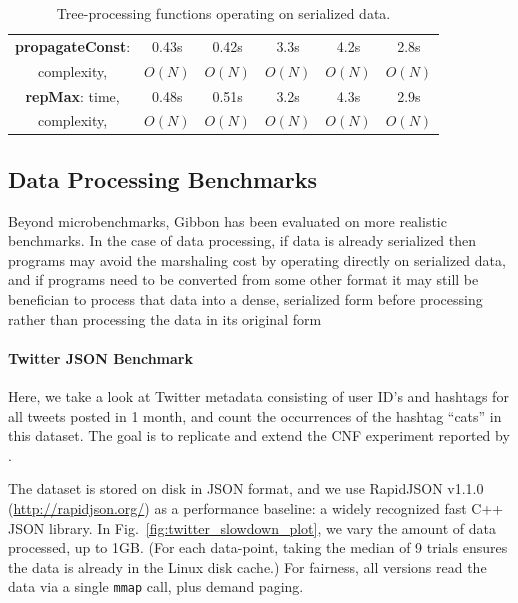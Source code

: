 \documentclass[showabstract,showacknowledgments,showpreface,showdedication,school]{iuphd}
\theoremstyle{nonumberplain}
\newcommand{\figref}[1]{Fig.~\ref{#1}}
\newcommand{\il}[1]{\lstinline[style=inline,mathescape=true];#1;}
\begin{document}
\begin{table}
\begin{center}
\begin{tabular}{ |c|c|c|c|c|c| }
                    {\bf propagateConst}:
                                         & 0.43s  &  0.42s  &  3.3s   & 4.2s   & 2.8s   \\
                    complexity,          & $O(N)$ &  $O(N)$ &  $O(N)$ & $O(N)$ & $O(N)$  \\
                    \hline

                    {\bf repMax}:
                    time,                & 0.48s  & 0.51s   & 3.2s    & 4.3s    & 2.9s   \\
                    complexity,          & $O(N)$ & $O(N)$  & $O(N)$  & $O(N)$  & $O(N)$  \\

                    \hline
      \end{tabular}
    \end{center}
  \vspace{-3mm}
    \caption{Tree-processing functions operating on serialized data.
      }
    \label{tab:litmus-table}

\end{table}


\subsection{Data Processing Benchmarks}


Beyond microbenchmarks, Gibbon has been evaluated on more realistic benchmarks.
In the case of data processing, if data is already serialized then programs
may avoid the marshaling cost by operating directly on serialized data,
and if programs need to be converted from some other format it may still be
benefician to process that data into a dense, serialized form before
processing rather than processing the data in its original form

\paragraph{Twitter JSON Benchmark}

Here, we take a look at Twitter metadata consisting of user ID's and hashtags
for all tweets posted in 1 month, and count the occurrences of the hashtag
``cats'' in this dataset. The goal is to replicate and extend the CNF experiment
reported by \cite{cnf-icfp15}.

The dataset is stored on disk in JSON format, and we use RapidJSON v1.1.0
({\footnotesize\url{http://rapidjson.org/}}) as a performance baseline: a widely
recognized fast C++ JSON library.
In \figref{fig:twitter_slowdown_plot}, we vary the amount of data processed,
up to 1GB. (For each data-point, taking the median of 9 trials
ensures the data is already in the Linux disk cache.)
For fairness, all versions read the data via a single \il{mmap} call, plus
demand paging.
\end{document}
